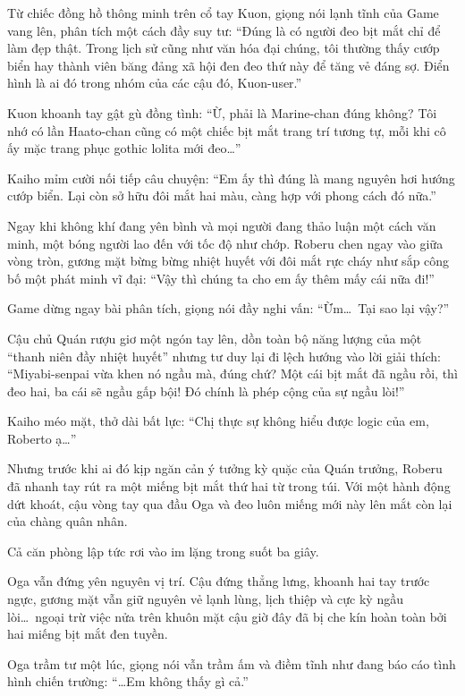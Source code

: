\documentclass[../main.tex]{subfiles}
\begin{document}
Từ chiếc đồng hồ thông minh trên cổ tay Kuon, giọng nói lạnh tĩnh của Game vang lên, phân tích một cách đầy suy tư: ``Đúng là có người đeo bịt mắt chỉ để làm đẹp thật. Trong lịch sử cũng như văn hóa đại chúng, tôi thường thấy cướp biển hay thành viên băng đảng xã hội đen đeo thứ này để tăng vẻ đáng sợ. Điển hình là ai đó trong nhóm \hll của các cậu đó, Kuon-user.''

Kuon khoanh tay gật gù đồng tình: ``Ừ, phải là Marine-chan đúng không? Tôi nhớ có lần Haato-chan cũng có một chiếc bịt mắt trang trí tương tự, mỗi khi cô ấy mặc trang phục gothic lolita mới đeo\dots''

Kaiho mỉm cười nối tiếp câu chuyện: ``Em ấy thì đúng là mang nguyên hơi hướng cướp biển. Lại còn sở hữu đôi mắt hai màu, càng hợp với phong cách đó nữa.''

Ngay khi không khí đang yên bình và mọi người đang thảo luận một cách văn minh, một bóng người lao đến với tốc độ như chớp. Roberu chen ngay vào giữa vòng tròn, gương mặt bừng bừng nhiệt huyết với đôi mắt rực cháy như sắp công bố một phát minh vĩ đại: ``Vậy thì chúng ta cho em ấy thêm mấy cái nữa đi!''

Game dừng ngay bài phân tích, giọng nói đầy nghi vấn: ``Ừm\dots\ Tại sao lại vậy?''

Cậu chủ Quán rượu giơ một ngón tay lên, dồn toàn bộ năng lượng của một ``thanh niên đầy nhiệt huyết'' nhưng tư duy lại đi lệch hướng vào lời giải thích: ``Miyabi-senpai vừa khen nó ngầu mà, đúng chứ? Một cái bịt mắt đã ngầu rồi, thì đeo hai, ba cái sẽ ngầu gấp bội! Đó chính là phép cộng của sự ngầu lòi!''

Kaiho méo mặt, thở dài bất lực: ``Chị thực sự không hiểu được logic của em, Roberto ạ\dots''

Nhưng trước khi ai đó kịp ngăn cản ý tưởng kỳ quặc của Quán trưởng, Roberu đã nhanh tay rút ra một miếng bịt mắt thứ hai từ trong túi. Với một hành động dứt khoát, cậu vòng tay qua đầu Oga và đeo luôn miếng mới này lên mắt còn lại của chàng quân nhân.

Cả căn phòng lập tức rơi vào im lặng trong suốt ba giây.

Oga vẫn đứng yên nguyên vị trí. Cậu đứng thẳng lưng, khoanh hai tay trước ngực, gương mặt vẫn giữ nguyên vẻ lạnh lùng, lịch thiệp và cực kỳ ngầu lòi\dots\ ngoại trừ việc nửa trên khuôn mặt cậu giờ đây đã bị che kín hoàn toàn bởi hai miếng bịt mắt đen tuyền.


Oga trầm tư một lúc, giọng nói vẫn trầm ấm và điềm tĩnh như đang báo cáo tình hình chiến trường: ``\dots Em không thấy gì cả.''
\end{document}

